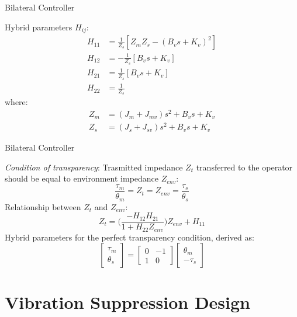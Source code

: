 \documentclass[10pt]{beamer}
\begin{document}
\begin{frame}[fragile]{Bilateral Controller}

Hybrid parameters $ H_{ij} $:
\begin{align*}
	H_{11} &= \frac{1}{Z_s}[Z_m Z_s - (B_v s + K_v)^2] \\
	H_{12} &= -\frac{1}{Z_s}[B_v s + K_v] \\
	H_{21} &= \frac{1}{Z_s}[B_v s + K_v] \\
	H_{22} &= \frac{1}{Z_s} 
\end{align*}
where:
\begin{align*}
	Z_m &= (J_m + J_{mv}) s^2 + B_v s + K_v \\
	Z_s &= (J_s + J_{sv}) s^2 + B_v s + K_v
\end{align*}

\end{frame}

\begin{frame}{Bilateral Controller}

\textit{Condition of transparency}: Trasmitted impedance $ Z_{t} $ transferred to the operator should be equal to environment impedance $ Z_{env} $:
\begin{equation*}
	\frac{\tau_m}{\theta_m} = Z_t = Z_{env} = \frac{\tau_s}{\theta_s}
\end{equation*}
Relationship between $ Z_{t} $ and $ Z_{env} $:
\begin{equation*}
	Z_t = \big(\dfrac{-H_{12} H_{21}}{1 + H_{22} Z_{env}}\big)Z_{env} + H_{11}
\end{equation*}
Hybrid parameters for the perfect transparency condition, derived as:
\begin{equation*}
	\begin{bmatrix}
	\tau_m \\ \theta_s
	\end{bmatrix} = 
	\begin{bmatrix}
	0 & -1 \\ 1 & 0
	\end{bmatrix}
	\begin{bmatrix}
	\theta_m \\ -\tau_s
	\end{bmatrix}
\end{equation*}

\end{frame}

\section{Vibration Suppression Design}
\end{document}
